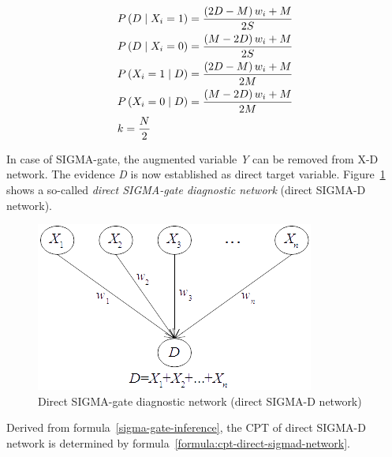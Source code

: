 \documentclass{article}
\numberwithin{equation}{section}
\numberwithin{figure}{section}
\numberwithin{table}{section}
\begin{document}
\begin{equation}
\begin{split}
&P\left(D\mathrel{\left|\vphantom{D X_i=1}\right.\kern-\nulldelimiterspace}X_i=1\right)=\frac{\left(2D-M\right)w_i+M}{2S}\\
&P\left(D\mathrel{\left|\vphantom{D X_i=0}\right.\kern-\nulldelimiterspace}X_i=0\right)=\frac{\left(M-2D\right)w_i+M}{2S}\\
&P\left(X_i=1\mathrel{\left|\vphantom{X_i=1 D}\right.\kern-\nulldelimiterspace}D\right)=\frac{\left(2D-M\right)w_i+M}{2M}\\
&P\left(X_i=0\mathrel{\left|\vphantom{X_i=0 D}\right.\kern-\nulldelimiterspace}D\right)=\frac{\left(M-2D\right)w_i+M}{2M}\\
&k=\frac{N}{2}
\end{split}
\label{cond-post-k-sigmad-network}
\end{equation}

In case of SIGMA-gate, the augmented variable \textit{Y} can be removed from X-D network. The evidence \textit{D} is now established as direct target variable. Figure~\ref{figure:direct-sigmad-network} shows a so-called \textit{direct SIGMA-gate diagnostic network} (direct SIGMA-D network).

\begin{figure}
\centering
\includegraphics{DirectSIGMADNetwork.png}
\caption{Direct SIGMA-gate diagnostic network (direct SIGMA-D network)}
\label{figure:direct-sigmad-network}
\end{figure}

Derived from formula~\ref{sigma-gate-inference}, the CPT of direct SIGMA-D network is determined by formula~\ref{formula:cpt-direct-sigmad-network}.
\end{document}
